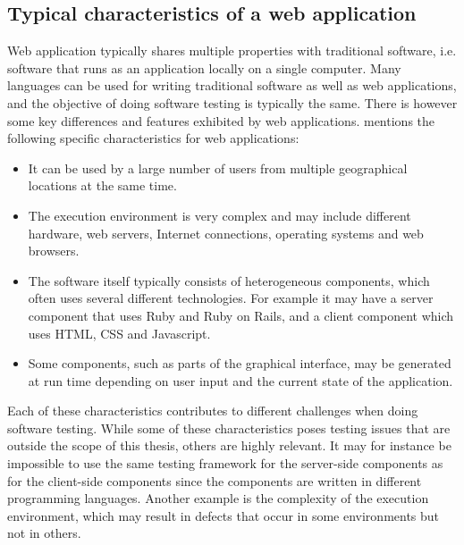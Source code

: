 \MakeShortVerb{\|}

\label{sec:testing_web}

\subsection{Typical characteristics of a web application}

Web application typically shares multiple properties with traditional
software, i.e. software that runs as an application locally on a single
computer. Many languages can be used for writing traditional software as
well as web applications, and the objective of doing software testing is
typically the same. There is however some key differences and features
exhibited by web applications. \citet{book:web} mentions the following
specific characteristics for web applications:\\

\begin{itemize}

\item It can be used by a large number of users from multiple
geographical locations at the same time.

\item The execution environment is very complex and may include
different hardware, web servers, Internet connections, operating systems
and web browsers.

\item The software itself typically consists of heterogeneous
components, which often uses several different technologies. For example
it may have a server component that uses Ruby and Ruby on Rails, and a
client component which uses HTML, CSS and Javascript.

\item Some components, such as parts of the graphical interface, may be
generated at run time depending on user input and the current state of
the application.

\end{itemize}

Each of these characteristics contributes to different challenges when
doing software testing. While some of these characteristics poses
testing issues that are outside the scope of this thesis, others are
highly relevant. It may for instance be impossible to use the same
testing framework for the server-side components as for the client-side
components since the components are written in different programming
languages. Another example is the complexity of the execution
environment, which may result in defects that occur in some environments
but not in others.\\


